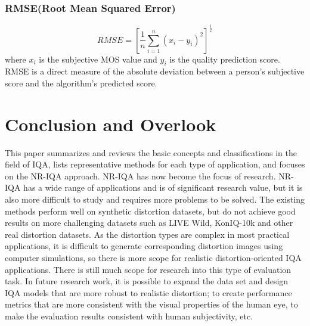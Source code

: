 \documentclass{article}
\begin{document}
\subsubsection{RMSE(Root Mean Squared Error)}
\label{RMSE}
$$RMSE=[{\frac{1}{n}\sum_{i=1}^n(x_i-y_i)^2}]^\frac{1}{2}$$
where $x_i$ is the subjective MOS value and $y_i$ is the quality prediction score. RMSE is a direct measure of the absolute deviation between a person's subjective score and the algorithm's predicted score.

\section{Conclusion and Overlook}
\label{Conclusion and Overlook}
This paper summarizes and reviews the basic concepts and classifications in the field of IQA, lists representative methods for each type of application, and focuses on the NR-IQA approach. NR-IQA has now become the focus of research. NR-IQA has a wide range of applications and is of significant research value, but it is also more difficult to study and requires more problems to be solved. The existing methods perform well on synthetic distortion datasets, but do not achieve good results on more challenging datasets such as LIVE Wild, KonIQ-10k and other real distortion datasets. As the distortion types are complex in most practical applications, it is difficult to generate corresponding distortion images using computer simulations, so there is more scope for realistic distortion-oriented IQA applications. There is still much scope for research into this type of evaluation task. In future research work, it is possible to expand the data set and design IQA models that are more robust to realistic distortion; to create performance metrics that are more consistent with the visual properties of the human eye, to make the evaluation results consistent with human subjectivity, etc.



\end{document}
